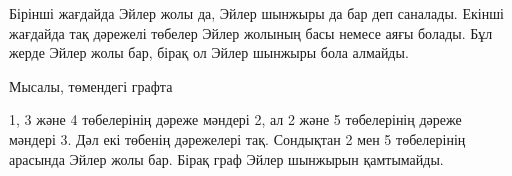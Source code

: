 
Бірінші жағдайда Эйлер жолы да,  Эйлер шынжыры да бар деп саналады.
Екінші жағдайда тақ дәрежелі төбелер Эйлер жолының басы немесе 
аяғы болады. Бұл жерде Эйлер жолы бар, бірақ ол Эйлер шынжыры бола алмайды.

\begin{samepage}
Мысалы, төмендегі графта
\begin{center}
\end{center}
\end{samepage}
1, 3 және 4 төбелерінің дәреже мәндері 2, ал 
2 және 5 төбелерінің дәреже мәндері 3.
Дәл екі төбенің дәрежелері тақ.
Сондықтан 2 мен 5 төбелерінің арасында Эйлер жолы бар. 
Бірақ граф Эйлер шынжырын қамтымайды.

